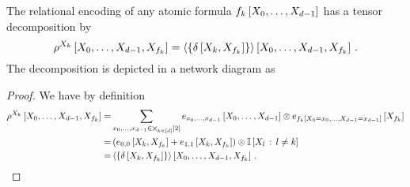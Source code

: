 \begin{theorem}\label{the:AtomicFTensor}
	The relational encoding of any atomic formula $f_{k}\left[X_{0},\ldots,X_{d-1}\right]$ has a tensor decomposition by
		\[ \rho^{X_{k}}\left[X_{0},\ldots,X_{d-1},X_{f_{k}}\right]
		= \left\langle \{\delta\left[X_{k},X_{f_{k}}\right]\}\right\rangle \left[ X_{0},\ldots,X_{d-1},X_{f_{k}} \right] \, . \]
	The decomposition is depicted in a network diagram as
	\begin{center}
		
	\end{center}
\end{theorem}
\begin{proof}
	We have by definition
	\begin{align*}
		\rho^{X_{k}}\left[X_{0},\ldots,X_{d-1},X_{f_{k}}\right]
		=& \sum_{x_{0},\ldots,x_{d-1}\in\bigtimes_{k\in[d]}[2]} e_{x_{0},\ldots,x_{d-1}}\left[X_{0},\ldots,X_{d-1}\right] \otimes e_{f_{k}\left[X_{0}=x_{0},\ldots,X_{d-1}=x_{d-1}\right]}\left[X_{f_{k}}\right] \\
		=& \left( e_{0,0}\left[X_{k},X_{f_{k}}\right] +
		e_{1,1}\left[X_{k},X_{f_{k}}\right] \right) \otimes \mathbb{I}\left[X_{l}\, : \, l \neq k\right] \\
		=& \left\langle \{\delta\left[X_{k},X_{f_{k}}\right]\}\right\rangle \left[ X_{0},\ldots,X_{d-1},X_{f_{k}} \right] \, .
	\end{align*} 
\end{proof}



